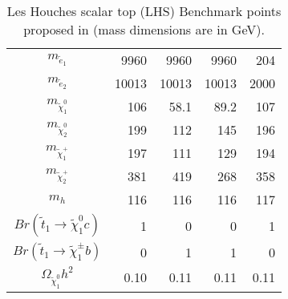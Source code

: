 \begin{table}[htb]
\begin{center}
\begin{tabular}{crrrr}
            $m_{{\tilde e}_1}$ &    9960 &    9960 &    9960 &     204 \\
            $m_{{\tilde e}_2}$ &   10013 &   10013 &   10013 &    2000 \\
       $m_{{\tilde \chi}^0_1}$ &     106 &    58.1 &    89.2 &     107 \\
       $m_{{\tilde \chi}^0_2}$ &     199 &     112 &     145 &     196 \\
       $m_{{\tilde \chi}^+_1}$ &     197 &     111 &     129 &     194 \\
       $m_{{\tilde \chi}^+_2}$ &     381 &     419 &     268 &     358 \\
                       $m_{h}$ &     116 &     116 &     116 &     117 \\ \midrule
$Br({\tilde t}_1\to{\tilde \chi}^0_1 c)$ 
                               &       1 &       0 &       0 &       1 \\
$Br({\tilde t}_1\to{\tilde \chi}^\pm_1 b)$ 
                               &       0 &       1 &       1 &       0 \\ \midrule
  $\Omega_{{\tilde \chi}^0_1} h^2$ 
                               &    0.10 &    0.11 &    0.11 &    0.11 \\ \hline \hline
\end{tabular}
\end{center}
\caption{Les Houches scalar top (LHS) Benchmark points proposed in \cite{Balazs} (mass dimensions are in GeV).}
\label{Tab:Benchmark}
\end{table}







